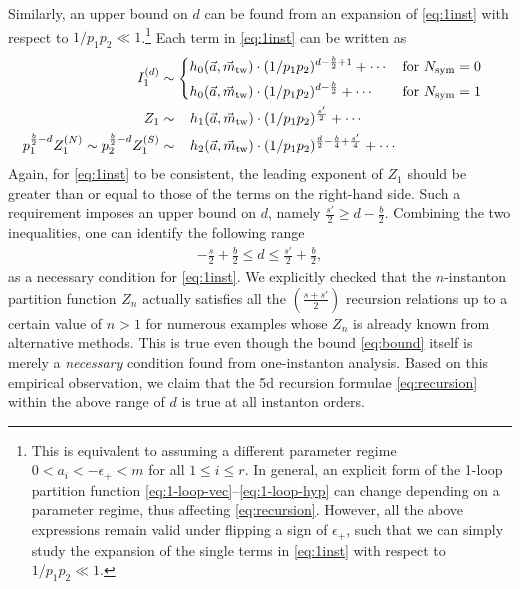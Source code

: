 \documentclass[letterpaper, 11pt]{article}
\newcommand{\nn}{\nonumber}
\def\IZ{\mathbb{Z}}
\def\CN{{\cal N}}
\def\e{\epsilon}
\begin{document}
{Similarly, an upper bound on $d$ can be found from an expansion of \eqref{eq:1inst} with respect to $ 1/p_1p_2 \ll 1$.\footnote{This is equivalent to assuming a different parameter regime $ 0 < a_i < -\e_+ < m$ for all $1\leq i \leq r$. In general, an explicit form of the 1-loop partition function \eqref{eq:1-loop-vec}--\eqref{eq:1-loop-hyp} can change depending on a parameter regime, thus affecting \eqref{eq:recursion}. However, all the above expressions remain valid under flipping a sign of $\epsilon_+$, such that we can simply study the expansion of the single terms in \eqref{eq:1inst} with respect to $ 1/p_1p_2 \ll 1$.} 
Each term in \eqref{eq:1inst} can be written as
\begin{align}
\begin{split}
  I_1^{(d)} &\sim \begin{dcases}
    h_0(\vec{a},  \vec{m}_{\text{tw}})\cdot  (1/p_1p_2)^{d-\frac{b}{2} + 1} + \cdots   &  \text{for }N_\text{sym} = 0\\
    h_0(\vec{a},  \vec{m}_{\text{tw}})\cdot (1/p_1p_2)^{d-\frac{b}{2} } + \cdots    &  \text{for }N_\text{sym} = 1
\end{dcases}
   \\
  Z_1 &\sim  \ \ \,  h_1(\vec{a},  \vec{m}_{\text{tw}})\cdot (1/p_1p_2)^{\frac{s'}{2}}  + \cdots   \\
  p_1^{\frac{b}{2}-d}Z_1^{(N)} \sim  p_2^{\frac{b}{2}-d}  Z^{(S)}_1&\sim \ \ \,  h_2(\vec{a},  \vec{m}_{\text{tw}})\cdot  (1/p_1p_2)^{\frac{d}{2}-\frac{b}{4}+\frac{s'}{4}}   + \cdots   
\end{split}
\end{align}
Again, for \eqref{eq:1inst} to be consistent, the leading exponent of $Z_1$ should be greater than or equal to those of the terms on the right-hand side. Such a requirement imposes an upper bound on $d$, namely  $\frac{s'}{2} \geq  d - \frac{b}{2}$.
Combining the two inequalities, one can identify the following range
\begin{align}
  \label{eq:bound}
  -\frac{s}{2} + \frac{b}{2} \leq d \leq \frac{s'}{2} + \frac{b}{2},
\end{align}
as a necessary condition for \eqref{eq:1inst}. 
We explicitly checked that the $n$-instanton partition function $Z_n$ actually satisfies all the $(\frac{s+s'}{2})$ recursion relations up to a certain value of $n > 1$ for numerous examples whose $Z_n$ is already known from alternative methods. 
This is true even though the bound \eqref{eq:bound} itself is merely a \emph{necessary} condition found from one-instanton analysis. 
Based on this empirical observation, we claim that the 5d recursion formulae \eqref{eq:recursion} within the above range of $d$ is true at all instanton orders.

}
\end{document}
